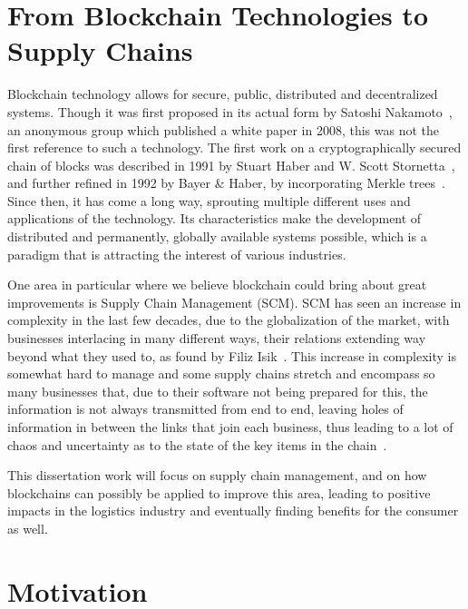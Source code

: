 \section{From Blockchain Technologies to Supply Chains} \label{sec:context}

Blockchain technology allows for secure, public, distributed and decentralized systems. Though it was first proposed in its actual form by Satoshi Nakamoto~\cite{Nakamoto2008}, an anonymous group which published a white paper in 2008, this was not the first reference to such a technology. The first work on a cryptographically secured chain of blocks was described in 1991 by Stuart Haber and W. Scott Stornetta~\cite{Haber1991}, and further refined in 1992 by Bayer \& Haber, by incorporating Merkle trees~\cite{Bayer1993}. Since then, it has come a long way, sprouting multiple different uses and applications of the technology. Its characteristics make the development of distributed and permanently, globally available systems possible, which is a paradigm that is attracting the interest of various industries.

One area in particular where we believe blockchain could bring about great improvements is Supply Chain Management (SCM). SCM has seen an increase in complexity in the last few decades, due to the globalization of the market, with businesses interlacing in many different ways, their relations extending way beyond what they used to, as found by Filiz Isik~\cite{Isik2011}. This increase in complexity is somewhat hard to manage and some supply chains stretch and encompass so many businesses that, due to their software not being prepared for this, the information is not always transmitted from end to end, leaving holes of information in between the links that join each business, thus leading to a lot of chaos and uncertainty as to the state of the key items in the chain~\cite{Wilding1998}.

   This dissertation work will focus on supply chain management, and on how blockchains can possibly be applied to improve this area, leading to positive impacts in the logistics industry and eventually finding benefits for the consumer as well. 


\section{Motivation} 
\label{sec:motivation}

